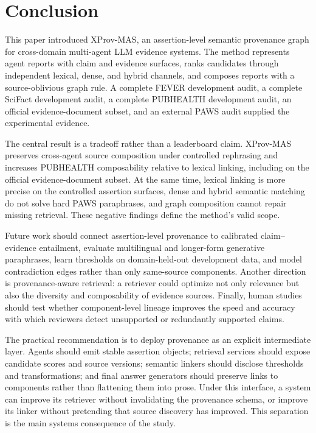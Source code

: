 \documentclass{ieeeaccess}
\begin{document}
\section{Conclusion}
This paper introduced XProv-MAS, an assertion-level semantic provenance graph for cross-domain multi-agent LLM evidence systems. The method represents agent reports with claim and evidence surfaces, ranks candidates through independent lexical, dense, and hybrid channels, and composes reports with a source-oblivious graph rule. A complete FEVER development audit, a complete SciFact development audit, a complete PUBHEALTH development audit, an official evidence-document subset, and an external PAWS audit supplied the experimental evidence.

The central result is a tradeoff rather than a leaderboard claim. XProv-MAS preserves cross-agent source composition under controlled rephrasing and increases PUBHEALTH composability relative to lexical linking, including on the official evidence-document subset. At the same time, lexical linking is more precise on the controlled assertion surfaces, dense and hybrid semantic matching do not solve hard PAWS paraphrases, and graph composition cannot repair missing retrieval. These negative findings define the method's valid scope.

Future work should connect assertion-level provenance to calibrated claim--evidence entailment, evaluate multilingual and longer-form generative paraphrases, learn thresholds on domain-held-out development data, and model contradiction edges rather than only same-source components. Another direction is provenance-aware retrieval: a retriever could optimize not only relevance but also the diversity and composability of evidence sources. Finally, human studies should test whether component-level lineage improves the speed and accuracy with which reviewers detect unsupported or redundantly supported claims.

The practical recommendation is to deploy provenance as an explicit intermediate layer. Agents should emit stable assertion objects; retrieval services should expose candidate scores and source versions; semantic linkers should disclose thresholds and transformations; and final answer generators should preserve links to components rather than flattening them into prose. Under this interface, a system can improve its retriever without invalidating the provenance schema, or improve its linker without pretending that source discovery has improved. This separation is the main systems consequence of the study.
\end{document}
